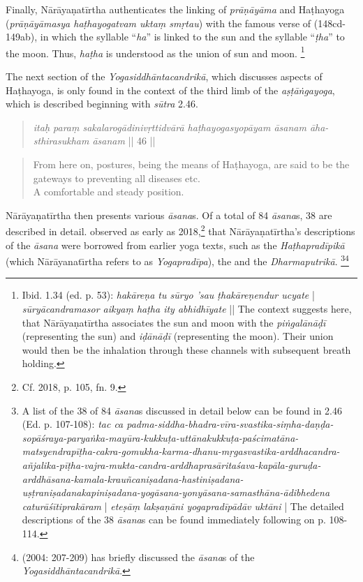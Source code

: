Finally, Nārāyaṇatīrtha authenticates the linking of \textit{prāṇāyāma} and Haṭhayoga (\textit{prāṇāyāmasya haṭhayogatvam uktaṃ smṛtau}) with the famous verse of  (148cd-149ab), in which the syllable ``\textit{ha}'' is linked to the sun and the syllable ``\textit{ṭha}'' to the moon. Thus, \textit{haṭha} is understood as the union of sun and moon. \footnote{Ibid. 1.34 (ed. p. 53): \textit{hakāreṇa tu sūryo 'sau ṭhakāreṇendur ucyate} | \textit{sūryācandramasor aikyaṃ haṭha ity abhidhīyate} || The context suggests here, that Nārāyaṇatīrtha associates the sun and moon with the \textit{piṅgalānāḍī} (representing the sun) and \textit{iḍānāḍī} (representing the moon). Their union would then be the inhalation through these channels with subsequent breath holding.}

The next section of the \textit{Yogasiddhāntacandrikā}, which discusses aspects of Haṭhayoga, is only found in the context of the third limb of the \textit{aṣṭāṅgayoga}, which is described beginning with \textit{sūtra} 2.46.

\begin{quote} \textit{itaḥ paraṃ sakalarogādinivṛttidvārā haṭhayogasyopāyam āsanam āha- \\
sthirasukham āsanam} || 46 || \end{quote}
\begin{quote} From here on, postures, being the means of Haṭhayoga, are said to be the gateways to preventing all diseases etc. \\
A comfortable and steady position.
\end{quote}

Nārāyaṇatīrtha then presents various \textit{āsana}s. Of a total of 84 \textit{āsana}s, 38 are described in detail. \citeauthor{birch2018proliferation} observed as early as 2018,\footnote{Cf. \citeauthor{birch2018proliferation} 2018, p. 105, fn. 9. } that Nārāyaṇatīrtha's descriptions of the \textit{āsana} were borrowed from earlier yoga texts, such as the \textit{Haṭhapradīpikā} (which Nārāyanatı̄rtha refers to as \textit{Yogapradīpa}), the  and the \textit{Dharmaputrikā}. \footnote{A list of the 38 of 84 \textit{āsana}s discussed in detail below can be found in  2.46 (Ed. p. 107-108): \textit{tac ca padma-siddha-bhadra-vīra-svastika-siṃha-daṇḍa-sopāśraya-paryaṅka-mayūra-kukkuṭa-uttānakukkuṭa-paścimatāna-matsyendrapīṭha-cakra-gomukha-karma-dhanu-mṛgasvastika-arddhacandra-añjalika-pīṭha-vajra-mukta-candra-arddhaprasāritaśava-kapāla-guruḍa-arddhāsana-kamala-krauñcaniṣadana-hastiniṣadana-uṣṭraniṣadanakapiniṣadana-yogāsana-yonyāsana-samasthāna-ādibhedena caturāśītiprakāram} | \textit{eteṣāṃ lakṣaṇāni yogapradīpādāv uktāni} | The detailed descriptions of the 38 \textit{āsana}s can be found immediately following on p. 108-114.}\footnote{\citeauthor{penna2004} (2004: 207-209) has briefly discussed the \textit{āsana}s of the \textit{Yogasiddhāntacandrikā}.}

